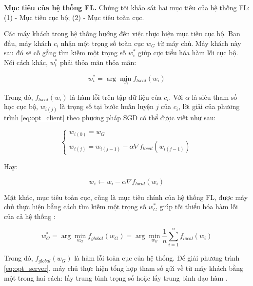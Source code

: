 \label{purpose_fl}
\textbf{Mục tiêu của hệ thống FL.} Chúng tôi khảo sát hai mục tiêu của hệ thống FL: (1) - Mục tiêu cục bộ; (2) - Mục tiêu toàn cục.

Các máy khách trong hệ thống hướng đến việc thực hiện mục tiêu cục bộ. Ban đầu, máy khách $c_i$ nhận một trọng số toàn cục $w_G$ từ máy chủ. Máy khách này sau đó sẽ cố gắng tìm kiếm một trọng số $w_i^*$ giúp cực tiểu hóa hàm lỗi cục bộ. Nói cách khác, $w_i^*$ phải thỏa mãn thỏa mãn:

\begin{equation}
    \label{eq:opt_client}
    w_i^* = \arg\min_{w_i}{f_{local}(w_i)}
\end{equation}

Trong đó, $f_{local}(w_i)$ là hàm lỗi trên tập dữ liệu của $c_i$. Với $\alpha$ là siêu tham số học cục bộ, $w_{i(j)}$ là trọng số tại bước huấn luyện $j$ của $c_i$, lời giải của phương trình \ref{eq:opt_client} theo phương pháp SGD có thể được viết như sau:

\begin{equation}
    \begin{cases}
        w_{i(0)} = w_G\\
        w_{i(j)} = w_{i(j-1)} - \alpha \nabla f_{local}(w_{i(j-1)})
    \end{cases}
\end{equation}

Hay:

\begin{dmath}
    w_i \leftarrow w_i - \alpha\nabla f_{local}(w_i)
\end{dmath}

Mặt khác, mục tiêu toàn cục, cũng là mục tiêu chính của hệ thống FL, được máy chủ thực hiện bằng cách tìm kiếm một trọng số $w_G^*$ giúp tối thiểu hóa hàm lỗi của cả hệ thống \cite{yin2021comprehensive}:

\begin{dmath}
    \label{eq:opt_server}
    w_G^* = \arg \min_{w_G}{f_{global}(w_G)}
        = \arg \min_{w_G}{\frac{1}{n} \sum_{i=1}^n{f_{local}(w_i)}}
\end{dmath}

Trong đó, $f_{global}(w_G)$ là hàm lỗi toàn cục của hệ thống. Để giải phương trình \ref{eq:opt_server}, máy chủ thực hiện tổng hợp tham số gửi về từ máy khách bằng một trong hai cách: lấy trung bình trọng số \parencite{mcmahan2017communication, aono2017privacy, yoon2021fedmix} hoặc lấy trung bình đạo hàm \parencite{chen2018federated, mcmahan2017learning}.

